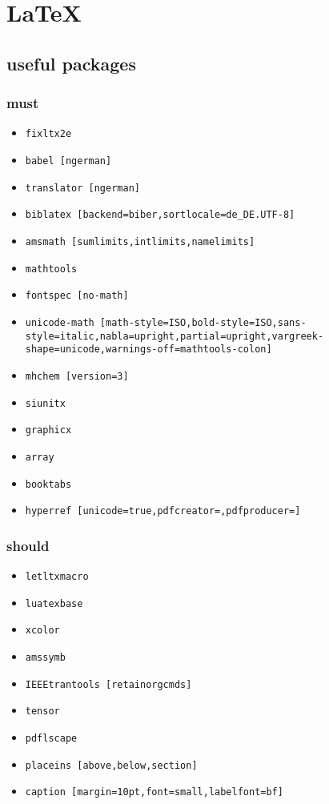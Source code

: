 \chapter{\LaTeX}
\section{useful packages}
\subsection{must}
\begin{itemize}
  \item \texttt{fixltx2e}
  \item \texttt{babel [ngerman]} 
  \item \texttt{translator [ngerman]}
  \item \texttt{biblatex [backend=biber,sortlocale=de\_DE.UTF-8]}
  \item \texttt{amsmath [sumlimits,intlimits,namelimits]}
  \item \texttt{mathtools}
  \item \texttt{fontspec [no-math]}
  \item \texttt{unicode-math [math-style=ISO,bold-style=ISO,sans-style=italic,nabla=upright,partial=upright,vargreek-shape=unicode,warnings-off={mathtools-colon}]}
  \item \texttt{mhchem [version=3]}
  \item \texttt{siunitx}
  \item \texttt{graphicx}
  \item \texttt{array}
  \item \texttt{booktabs}
  \item \texttt{hyperref [unicode=true,pdfcreator={},pdfproducer={}]}
\end{itemize}

\subsection{should}
\begin{itemize}
  \item \texttt{letltxmacro}
  \item \texttt{luatexbase}
  \item \texttt{xcolor}
  \item \texttt{amssymb}
  \item \texttt{IEEEtrantools [retainorgcmds]}
  \item \texttt{tensor}
  \item \texttt{pdflscape}
  \item \texttt{placeins [above,below,section]}
  \item \texttt{caption [margin=10pt,font=small,labelfont=bf]}
\end{itemize}


